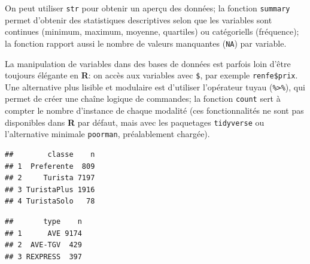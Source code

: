 \documentclass[
  11pt,
  letterpaper,
]{article}
\newenvironment{Shaded}{\begin{snugshade}}{\end{snugshade}}
\newcommand{\CommentTok}[1]{\textcolor[rgb]{0.56,0.35,0.01}{\textit{#1}}}
\newcommand{\KeywordTok}[1]{\textcolor[rgb]{0.13,0.29,0.53}{\textbf{#1}}}
\newcommand{\NormalTok}[1]{#1}
\newcommand{\OperatorTok}[1]{\textcolor[rgb]{0.81,0.36,0.00}{\textbf{#1}}}
\newcommand{\StringTok}[1]{\textcolor[rgb]{0.31,0.60,0.02}{#1}}
\theoremstyle{definition}
\theoremstyle{definition}
\theoremstyle{definition}
\theoremstyle{remark}
\begin{document}
On peut utiliser \texttt{str} pour obtenir un aperçu des données; la fonction \texttt{summary} permet d'obtenir des statistiques descriptives selon que les variables sont continues (minimum, maximum, moyenne, quartiles) ou catégoriells (fréquence); la fonction rapport aussi le nombre de valeurs manquantes (\texttt{NA}) par variable.

La manipulation de variables dans des bases de données est parfois loin d'être toujours élégante en \textbf{R}: on accès aux variables avec \texttt{\$}, par exemple \texttt{renfe\$prix}. Une alternative plus lisible et modulaire est d'utiliser l'opérateur tuyau (\texttt{\%\textgreater{}\%}), qui permet de créer une chaîne logique de commandes; la fonction \texttt{count} sert à compter le nombre d'instance de chaque modalité (ces fonctionnalités ne sont pas disponibles dans \textbf{R} par défaut, mais avec les paquetages \texttt{tidyverse} ou l'alternative minimale \texttt{poorman}, préalablement chargée).

\begin{Shaded}
\end{Shaded}

\begin{verbatim}
##        classe    n
## 1  Preferente  809
## 2     Turista 7197
## 3 TuristaPlus 1916
## 4 TuristaSolo   78
\end{verbatim}

\begin{Shaded}
\end{Shaded}

\begin{verbatim}
##       type    n
## 1      AVE 9174
## 2  AVE-TGV  429
## 3 REXPRESS  397
\end{verbatim}

\begin{Shaded}
\end{Shaded}
\end{document}
